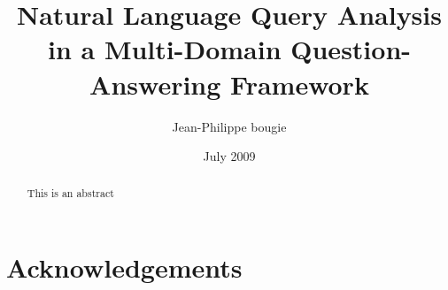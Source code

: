 \documentclass[a4paper]{report}
\begin{document}
\onehalfspacing

\title{Natural Language Query Analysis in a Multi-Domain Question-Answering Framework}
\author{Jean-Philippe bougie}
\date{July 2009}

\maketitle

\tableofcontents
\listoffigures
\listoftables

\chapter*{Acknowledgements}

\begin{abstract}
  This is an abstract
\end{abstract}







\end{document}
